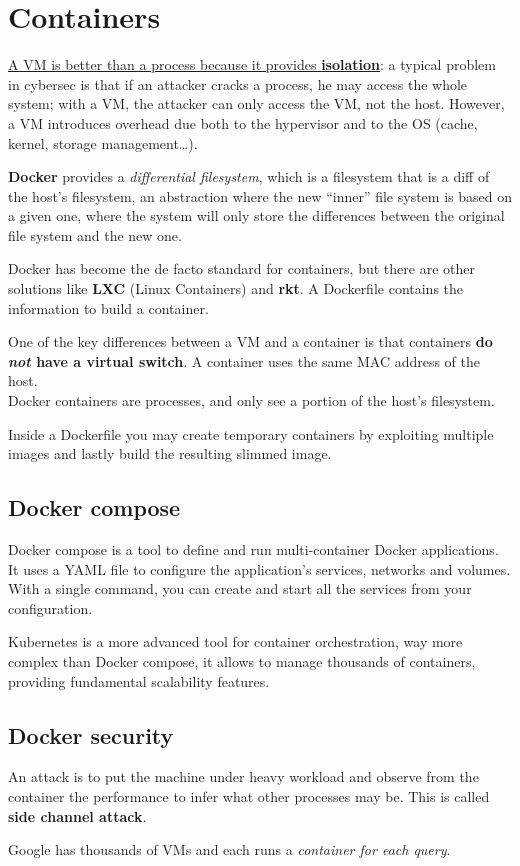 \chapter{Containers}
\label{chap:containers}

\ul{A VM is better than a process because it provides \textbf{isolation}}:
a typical problem in cybersec is that if an attacker cracks a process, he may access the whole system;
with a VM, the attacker can only access the VM, not the host.
However, a VM introduces overhead due both to the hypervisor and to the OS (cache, kernel, storage management\dots).


\textbf{Docker} provides a \textit{differential filesystem}, which is a filesystem that is a diff of the host's filesystem, an abstraction where the new ``inner'' file system is based on a given one, where the system will only store the differences between the original file system and the new one.

Docker has become the de facto standard for containers, but there are other solutions like \textbf{LXC} (Linux Containers) and \textbf{rkt}.
A Dockerfile contains the information to build a container.

One of the key differences between a VM and a container is that containers \textbf{do \textit{not} have a virtual switch}.
A container uses the same MAC address of the host.\\
Docker containers are processes, and only see a portion of the host's filesystem.

Inside a Dockerfile you may create temporary containers by exploiting multiple images and lastly build the resulting slimmed image.


\section{Docker compose}
Docker compose is a tool to define and run multi-container Docker applications. It uses a YAML file to configure the application's services, networks and volumes. With a single command, you can create and start all the services from your configuration.

Kubernetes is a more advanced tool for container orchestration, way more complex than Docker compose, it allows to manage thousands of containers, providing fundamental scalability features.

\section{Docker security}
An attack is to put the machine under heavy workload and observe from the container the performance to infer what other processes may be. This is called \textbf{side channel attack}.

Google has thousands of VMs and each runs a \textit{container for each query}.